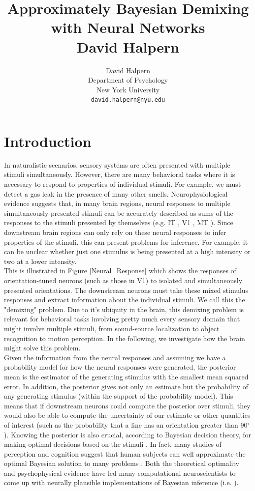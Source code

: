 \documentclass{article} %
\title{Approximately Bayesian Demixing with Neural Networks \\ David Halpern}
\author{
David Halpern\\
Department of Psychology\\
New York University\\
\texttt{david.halpern@nyu.edu} \\
}
\begin{document}
\maketitle


\section{Introduction}
In naturalistic scenarios, sensory systems are often presented with multiple stimuli simultaneously. However, there are many behavioral tasks where it is necessary to respond to properties of individual stimuli. For example, we must detect a gas leak in the presence of many other smells. Neurophysiological evidence suggests that, in many brain regions, neural responses to multiple simultaneously-presented stimuli can be accurately described as sums of the responses to the stimuli presented by themselves (e.g. IT \cite{Zoccolan07112007}, V1 \cite{Busse2009}, MT \cite{Britten15061999}).  Since downstream brain regions can only rely on these neural responses to infer properties of the stimuli, this can present problems for inference. For example, it can be unclear whether just one stimulus is being presented at a high intensity or two at a lower intensity. 
\\
This is illustrated in Figure \ref{Neural_Response} which shows the responses of orientation-tuned neurons (such as those in V1) to isolated and simultaneously presented orientations. The downstream neurons must take these mixed stimulus responses and extract information about the individual stimuli. We call this the "demixing" problem. Due to it's ubiquity in the brain, this demixing problem is relevant for behavioral tasks involving pretty much every sensory domain that might involve multiple stimuli, from sound-source localization to object recognition to motion perception. In the following, we investigate how the brain might solve this problem.
\\
Given the information from the neural responses and assuming we have a probability model for how the neural responses were generated, the posterior mean is the estimator of the generating stimulus with the smallest mean squared error. In addition, the posterior gives not only an estimate but the probability of any generating stimulus (within the support of the probability model). This means that if downstream neurons could compute the posterior over stimuli, they would also be able to compute the uncertainty of our estimate or other quantities of interest (such as the probability that a line has an orientation greater than 90$^{\circ}$). Knowing the posterior is also crucial, according to Bayesian decision theory, for making optimal decisions based on the stimuli \cite{rice06statistics}. In fact, many studies of perception and cognition suggest that human subjects can well approximate the optimal Bayesian solution to many problems \cite{Ernst2002} \cite{Stocker2006} \cite{Griffiths01092006}. Both the theoretical optimality and psychophysical evidence have led many computational neuroscientists to come up with neurally plausible implementations of Bayesian inference (i.e. \cite{Ma2006}). 
\end{document}
